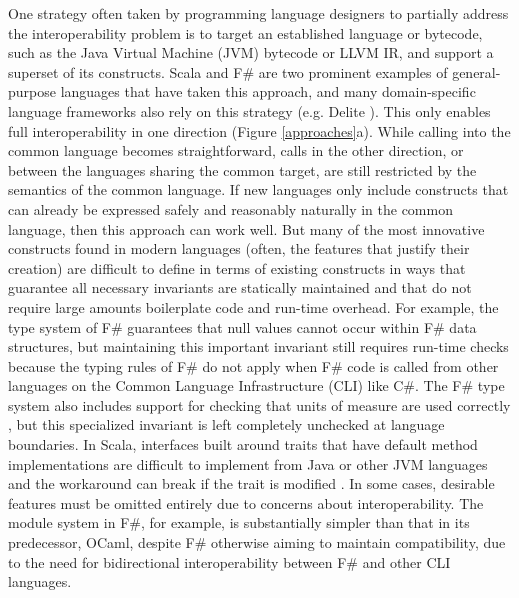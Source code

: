 One strategy often taken by programming language designers to partially address the interoperability problem is to  target an established language or bytecode, such as the Java Virtual Machine (JVM) bytecode or LLVM IR, and support a superset of its constructs. Scala \cite{scala} and F\# \cite{fsharp} are two prominent examples of general-purpose languages that have taken this approach, and many domain-specific language frameworks also rely on this strategy (e.g. Delite \cite{delite}). This only enables full interoperability in one direction (Figure \ref{approaches}a). While calling into the common language becomes straightforward, calls in the other direction, or between the languages sharing the common target, are still restricted by the semantics of the common language. 
If new languages only include constructs that can already be expressed safely and reasonably naturally in the common language, then this approach can work well. 
But many of the most innovative constructs found in modern languages (often, the features that justify their creation) are difficult to define in terms of existing constructs in ways that guarantee all necessary invariants are statically maintained and that do not require large amounts boilerplate code and run-time overhead. For example, the type system of F\# guarantees that null values cannot occur within F\# data structures, but maintaining this important invariant still requires run-time checks because the typing rules of F\# do not apply when F\# code is called from other languages on the Common Language Infrastructure (CLI) like C\#. The F\# type system also includes support for checking that units of measure are used correctly \cite{fsharpunits}, but this specialized invariant is left completely unchecked at language boundaries. In Scala, interfaces built around traits that have default method implementations are difficult to implement from Java or other JVM languages and the workaround can break if the trait is modified \cite{scalatraitinterop}. In some cases, desirable features must be omitted entirely due to concerns about  interoperability. The module system in F\#, for example, is substantially simpler than that in its predecessor, OCaml, despite F\# otherwise aiming to maintain compatibility, due to the need for bidirectional interoperability between F\# and other CLI languages.

